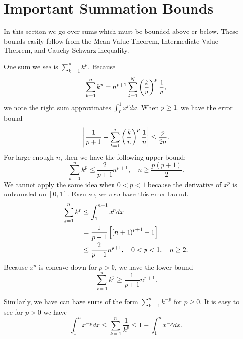 \section{Important Summation Bounds}
\label{sec:cvip_sum_bounds}

In this section we go over sums which must be bounded above or below.
These bounds easily follow from the Mean Value Theorem,
Intermediate Value Theorem, and Cauchy-Schwarz inequality.

One sum we see is $\sum_{k=1}^{n}k^{p}$. Because
%
\begin{equation}
    \sum_{k=1}^{n} k^{p} = n^{p+1} \sum_{k=1}^{N} \left( \frac{k}{n} \right)^{p}
        \frac{1}{n},
\end{equation}
%
we note the right sum approximates $\int_{0}^{1}x^{p}dx$. When $p\ge1$,
we have the error bound
%
\begin{equation}
    \left| \frac{1}{p+1} - \sum_{k=1}^{n}\left( \frac{k}{n} \right)^{p}\frac{1}{n} \right|
        \le \frac{p}{2n}.
\end{equation}
%
For large enough $n$, then we have the following upper bound:
%
\begin{equation}
    \sum_{k=1}^{n} k^{p} \le \frac{2}{p+1}n^{p+1},\quad
    n\ge\frac{p(p+1)}{2}.
\end{equation}
%
We cannot apply the same idea when $0<p<1$ because the derivative
of $x^{p}$ is unbounded on $[0,1]$.
Even so, we also have this error bound:
%
\begin{align}
    \sum_{k=1}^{n}k^{p} &\le \int_{1}^{n+1} x^{p}dx \nonumber\\
        &= \frac{1}{p+1}\left[ \left( n+1 \right)^{p+1}-1 \right] \nonumber\\
        &\le \frac{2}{p+1}n^{p+1}, \quad 0<p<1, \quad n\ge2.
\end{align}
%
Because $x^{p}$ is concave down for $p>0$, we have the lower bound
%
\begin{equation}
    \sum_{k=1}^{n} k^{p} \ge \frac{1}{p+1}n^{p+1}.
\end{equation}

Similarly, we have can have sums of the form
$\sum_{k=1}^{n} k^{-p}$ for $p\ge0$.
It is easy to see for $p>0$ we have
%
\begin{equation}
    \int_{1}^{n} x^{-p}dx \le \sum_{k=1}^{n}\frac{1}{k^{p}}
        \le 1 + \int_{1}^{n}x^{-p}dx.
\end{equation}

